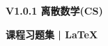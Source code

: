\maketitle

\thispagestyle{empty}

\vspace{5cm}

\begin{center}
    \songti
    \textbf{V1.0.1 离散数学(CS)} 

    \textbf{课程习题集 | \LaTeX}
\end{center}

\newpage

\pagestyle{plain}
\setcounter{page}{1}
\tableofcontents
\newpage
\setcounter{page}{1}
